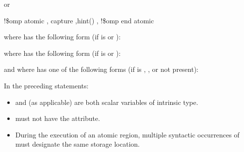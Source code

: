 \begin{fortranspecific}
or

\begin{boxedcode}
!\$omp atomic \plc{[memory-order-clause[},\plc{]]} capture \plc{[[},\plc{]}hint()\plc{]} 
             \plc{[[},\plc{]memory-order-clause]}
!\$omp end atomic
\end{boxedcode}

where  has the following form (if  
is  or ):

\begin{quote}
\end{quote}

where  has the following form (if  
is  or ):

\begin{quote}
\end{quote}

\begin{figure}[t!]
\end{figure}
and where  has one of the following forms (if  is , 
, or not present):

\begin{quote}



\end{quote}

In the preceding statements:

\begin{itemize}
\item {} and  (as applicable) are both scalar variables of intrinsic type.

\item {} must not have the  attribute.

\item During the execution of an atomic region, multiple syntactic occurrences of  must 
designate the same storage location.


\end{itemize}
\end{fortranspecific}
